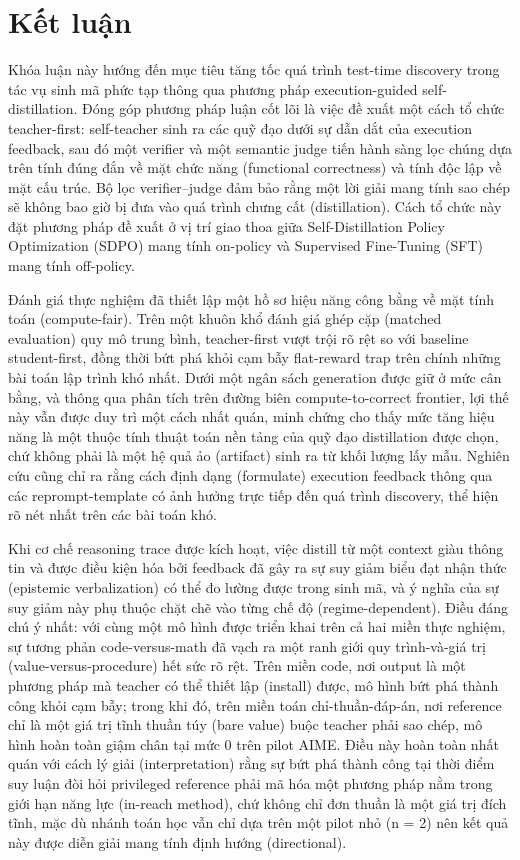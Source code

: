 \chapter{Kết luận}\label{chapter-7-conclusion}

Khóa luận này hướng đến mục tiêu tăng tốc quá trình test-time discovery trong tác vụ sinh mã phức tạp thông qua phương pháp execution-guided self-distillation. Đóng góp phương pháp luận cốt lõi là việc đề xuất một cách tổ chức teacher-first: self-teacher sinh ra các quỹ đạo dưới sự dẫn dắt của execution feedback, sau đó một verifier và một semantic judge tiến hành sàng lọc chúng dựa trên tính đúng đắn về mặt chức năng (functional correctness) và tính độc lập về mặt cấu trúc. Bộ lọc verifier--judge đảm bảo rằng một lời giải mang tính sao chép sẽ không bao giờ bị đưa vào quá trình chưng cất (distillation). Cách tổ chức này đặt phương pháp đề xuất ở vị trí giao thoa giữa Self-Distillation Policy Optimization (SDPO) mang tính on-policy và Supervised Fine-Tuning (SFT) mang tính off-policy.

Đánh giá thực nghiệm đã thiết lập một hồ sơ hiệu năng công bằng về mặt tính toán (compute-fair). Trên một khuôn khổ đánh giá ghép cặp (matched evaluation) quy mô trung bình, teacher-first vượt trội rõ rệt so với baseline student-first, đồng thời bứt phá khỏi cạm bẫy flat-reward trap trên chính những bài toán lập trình khó nhất. Dưới một ngân sách generation được giữ ở mức cân bằng, và thông qua phân tích trên đường biên compute-to-correct frontier, lợi thế này vẫn được duy trì một cách nhất quán, minh chứng cho thấy mức tăng hiệu năng là một thuộc tính thuật toán nền tảng của quỹ đạo distillation được chọn, chứ không phải là một hệ quả ảo (artifact) sinh ra từ khối lượng lấy mẫu. Nghiên cứu cũng chỉ ra rằng cách định dạng (formulate) execution feedback thông qua các reprompt-template có ảnh hưởng trực tiếp đến quá trình discovery, thể hiện rõ nét nhất trên các bài toán khó.

Khi cơ chế reasoning trace được kích hoạt, việc distill từ một context giàu thông tin và được điều kiện hóa bởi feedback đã gây ra sự suy giảm biểu đạt nhận thức (epistemic verbalization) có thể đo lường được trong sinh mã, và ý nghĩa của sự suy giảm này phụ thuộc chặt chẽ vào từng chế độ (regime-dependent). Điều đáng chú ý nhất: với cùng một mô hình được triển khai trên cả hai miền thực nghiệm, sự tương phản code-versus-math đã vạch ra một ranh giới quy trình-và-giá trị (value-versus-procedure) hết sức rõ rệt. Trên miền code, nơi output là một phương pháp mà teacher có thể thiết lập (install) được, mô hình bứt phá thành công khỏi cạm bẫy; trong khi đó, trên miền toán chỉ-thuần-đáp-án, nơi reference chỉ là một giá trị tĩnh thuần túy (bare value) buộc teacher phải sao chép, mô hình hoàn toàn giậm chân tại mức 0 trên pilot AIME. Điều này hoàn toàn nhất quán với cách lý giải (interpretation) rằng sự bứt phá thành công tại thời điểm suy luận đòi hỏi privileged reference phải mã hóa một phương pháp nằm trong giới hạn năng lực (in-reach method), chứ không chỉ đơn thuần là một giá trị đích tĩnh, mặc dù nhánh toán học vẫn chỉ dựa trên một pilot nhỏ (n = 2) nên kết quả này được diễn giải mang tính định hướng (directional).


